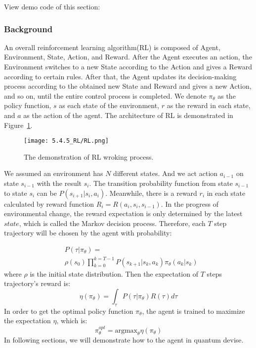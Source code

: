 View demo code of this section: 

\subsubsection{Background}

An overall reinforcement learning algorithm(RL) is composed of Agent, Environment, State, Action, and Reward. After the Agent executes an action, the Environment switches to a new State according to the Action and gives a Reward according to certain rules. After that, the Agent updates its decision-making process according to the obtained new State and Reward and gives a new Action, and so on, until the entire control process is completed. We denote $\pi_{\theta}$ as the policy function, $s$ as each state of the environment, $r$ as the reward in each state, and $a$ as the action of the agent. The architecture of RL is demonstrated in Figure~\ref{RL_frame}.
\begin{figure}[ht]
  \centering
  \texttt{[image: 5.4.5\_RL/RL.png]}
  \caption{\label{RL_frame} The demonstration of RL wroking process.}
\end{figure}

We assumed an environment has $N$ different states. And we act action $a_{i-1}$ on state $s_{i-1}$ with the result $s_{i}$. The transition probability function from state $s_{i-1}$ to state $s_{i}$ can be $P(s_{i+1}|s_{i},a_{i})$. Meanwhile, there is a reward $r_i$ in each state calculated by reward function $R_i=R(a_i,s_i,s_{i-1})$. In the progress of environmental change, the reward expectation is only determined by the latest $state$, which is called the Markov decision process. Therefore, each $T$ step trajectory will be chosen by the agent with probability:

\begin{equation}
    \begin{split}
        &P(\tau|\pi_{\theta})=\\
        &\rho(s_0)\prod_{k=0}^{k=T-1}P(s_{k+1}|s_{k},a_{k})\pi_{\theta}(a_{k}|s_{k})
    \end{split}
\end{equation}
where $\rho$ is the initial state distribution. Then the expectation of $T$ steps trajectory's reward is:
\begin{equation}
    \eta(\pi_{\theta})=\int_{\tau}P(\tau|\pi_{\theta})R(\tau)d\tau
\end{equation}
In order to get the optimal policy function $\pi_{\theta}$, the agent is trained to maximize the expectation $\eta$, which is:
\begin{equation}
    \pi_{\theta}^{opt}=\mathrm{argmax}_{\theta}\eta(\pi_{\theta})
\end{equation}
In following sections, we will demonstrate how to the agent in quantum devise.

